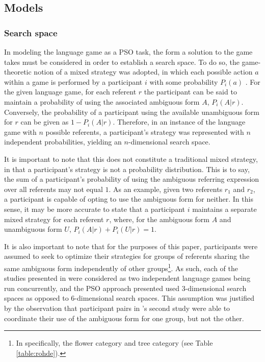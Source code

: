 \documentclass[12pt,a4paper]{article}
\begin{document}
\subsection{Models}
\subsubsection{Search space}
\label{sec:search_space}

In modeling the \citeauthor{rohde2012} language game as a PSO task, the form a solution to the game takes must be considered in order to establish a search space.  To do so, the game-theoretic notion of a mixed strategy was adopted, in which each possible action $a$ within a game is performed by a participant $i$ with some probability $P_i(a)$ \citep{benz2005}. For the given language game, for each referent $r$ the participant can be said to maintain a probability of using the associated ambiguous form $A$, $P_i(A|r)$. Conversely, the probability of a participant using the available unambiguous form for $r$ can be given as $1 - P_i(A|r)$. Therefore, in an instance of the \citeauthor{rohde2012} language game with $n$ possible referents, a participant's strategy was represented with $n$ independent probabilities, yielding an $n$-dimensional search space. 

It is important to note that this does not constitute a traditional mixed strategy, in that a participant's strategy is not a probability distribution. This is to say, the sum of a participant's probability of using the ambiguous referring expression over all referents may not equal $1$. As an example, given two referents $r_1$ and $r_2$, a participant is capable of opting to use the ambiguous form for neither. In this sense, it may be more accurate to state that a participant $i$ maintains a separate mixed strategy for each referent $r$, where, for the ambiguous form $A$ and unambiguous form $U$, $P_i(A|r) + P_i(U|r) = 1$.

It is also important to note that for the purposes of this paper, participants were assumed to seek to optimize their strategies for groups of referents sharing the same ambiguous form independently of other groups\footnote{In \citeauthor{rohde2012} specifically, the flower category and tree category (see Table \ref{table:rohde}).}. As such, each of the studies presented in \citeauthor{rohde2012} were considered as two independent language games being run concurrently, and the PSO approach presented used 3-dimensional search spaces as opposed to 6-dimensional search spaces. This assumption was justified by the observation that participant pairs in \citeauthor{rohde2012}'s second study were able to coordinate their use of the ambiguous form for one group, but not the other. 
\end{document}
